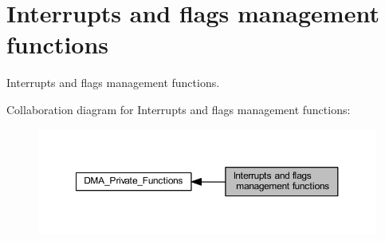 \hypertarget{group___d_m_a___group4}{}\section{Interrupts and flags management functions}
\label{group___d_m_a___group4}


Interrupts and flags management functions.  


Collaboration diagram for Interrupts and flags management functions\+:
\nopagebreak
\begin{figure}[H]
\begin{center}
\leavevmode
\includegraphics[width=350pt]{group___d_m_a___group4}
\end{center}
\end{figure}
